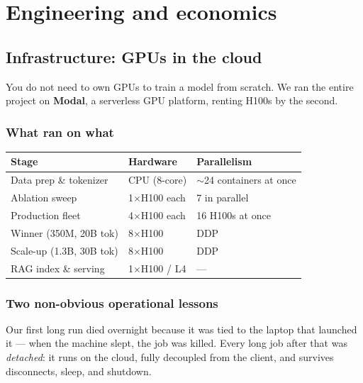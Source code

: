 \part{Engineering and economics}

\chapter{Infrastructure: GPUs in the cloud}

You do not need to own GPUs to train a model from scratch. We ran the entire project on
\textbf{Modal}, a serverless GPU platform, renting H100s by the second.

\section{What ran on what}
\begin{center}\small
\begin{tabular}{@{}lll@{}}
\toprule
\textbf{Stage} & \textbf{Hardware} & \textbf{Parallelism}\\
\midrule
Data prep \& tokenizer & CPU (8-core) & $\sim$24 containers at once\\
Ablation sweep & 1$\times$H100 each & 7 in parallel\\
Production fleet & 4$\times$H100 each & 16 H100s at once\\
Winner (350M, 20B tok) & 8$\times$H100 & DDP\\
Scale-up (1.3B, 30B tok) & 8$\times$H100 & DDP\\
RAG index \& serving & 1$\times$H100 / L4 & ---\\
\bottomrule
\end{tabular}
\end{center}

\section{Two non-obvious operational lessons}
\begin{gotcha}
Our first long run died overnight because it was tied to the laptop that launched it --- when the machine
slept, the job was killed. Every long job after that was \emph{detached}: it runs on the cloud, fully
decoupled from the client, and survives disconnects, sleep, and shutdown.
\end{gotcha}


